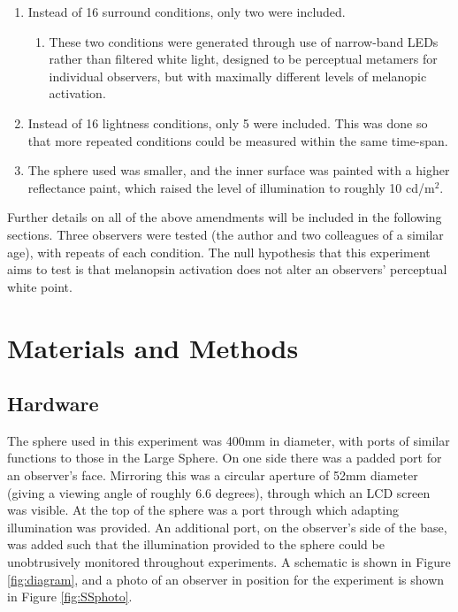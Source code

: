 \begin{enumerate}
    \item Instead of 16 surround conditions, only two were included.
    \begin{enumerate}
        \item These two conditions were generated through use of narrow-band \glspl{LED} rather than filtered white light, designed to be perceptual metamers for individual observers, but with maximally different levels of melanopic activation.
    \end{enumerate}
    \item Instead of 16 lightness conditions, only 5 were included. This was done so that more repeated conditions could be measured within the same time-span.
    \item The sphere used was smaller, and the inner surface was painted with a higher reflectance paint, which raised the level of illumination to roughly 10 cd/m$^2$.
\end{enumerate}

Further details on all of the above amendments will be included in the following sections. Three observers were tested (the author and two colleagues of a similar age), with repeats of each condition. The null hypothesis that this experiment aims to test is that melanopsin activation does not alter an observers' perceptual white point.

\section{Materials and Methods}

\subsection{Hardware}

The sphere used in this experiment was 400mm in diameter, with ports of similar functions to those in the Large Sphere. On one side there was a padded port for an observer's face. Mirroring this was a circular aperture of 52mm diameter (giving a viewing angle of roughly 6.6 degrees), through which an LCD screen was visible. At the top of the sphere was a port through which adapting illumination was provided. An additional port, on the observer's side of the base, was added such that the illumination provided to the sphere could be unobtrusively monitored throughout experiments. A schematic is shown in Figure \ref{fig:diagram}, and a photo of an observer in position for the experiment is shown in Figure \ref{fig:SSphoto}.

